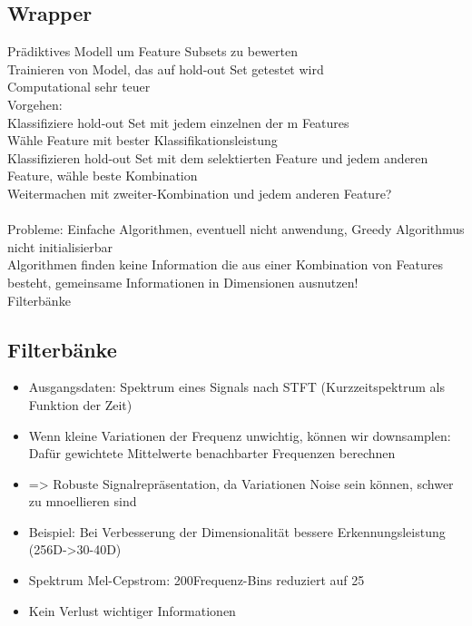 \documentclass[a4paper,10pt,oneside]{article}
\begin{document}
\subsection{Wrapper}
Prädiktives Modell um Feature Subsets zu bewerten\\
Trainieren von Model, das auf hold-out Set getestet wird\\
Computational sehr teuer\\
Vorgehen:\\
Klassifiziere hold-out Set mit jedem einzelnen der m Features\\
Wähle Feature mit bester Klassifikationsleistung\\
Klassifizieren hold-out Set mit dem selektierten Feature und jedem anderen Feature, wähle beste Kombination\\
Weitermachen mit zweiter-Kombination und jedem anderen Feature?
\\ \\
Probleme: Einfache Algorithmen, eventuell nicht anwendung, Greedy Algorithmus nicht initialisierbar\\
Algorithmen finden keine Information die aus einer Kombination von Features besteht, gemeinsame Informationen in Dimensionen ausnutzen!\\
Filterbänke
\subsection{Filterbänke}
\begin{itemize}
	\item Ausgangsdaten: Spektrum eines Signals nach STFT (Kurzzeitspektrum als Funktion der Zeit)
	\item Wenn kleine Variationen der Frequenz unwichtig, können wir downsamplen: Dafür gewichtete Mittelwerte benachbarter Frequenzen berechnen
	\item => Robuste Signalrepräsentation, da Variationen Noise sein können, schwer zu mnoellieren sind
	\item Beispiel: Bei Verbesserung der Dimensionalität bessere Erkennungsleistung (256D->30-40D)
	\item Spektrum Mel-Cepstrom: 200Frequenz-Bins reduziert auf 25
	\item Kein Verlust wichtiger Informationen
\end{itemize}
\end{document}
